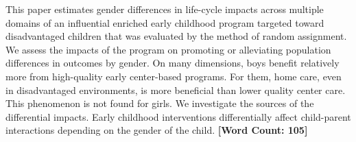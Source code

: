 \noindent This paper estimates gender differences in life-cycle impacts across multiple domains of an influential enriched early childhood program targeted toward disadvantaged children that was evaluated by the method of random assignment. We assess the impacts of the program on promoting or alleviating population differences in outcomes by gender. On many dimensions, boys benefit relatively more from high-quality early center-based programs. For them, home care, even in disadvantaged environments, is more beneficial than lower quality center care. This phenomenon is not found for girls. We investigate the sources of the differential impacts. Early childhood interventions differentially affect child-parent interactions depending on the gender of the child. \textbf{[Word Count: 105]} 